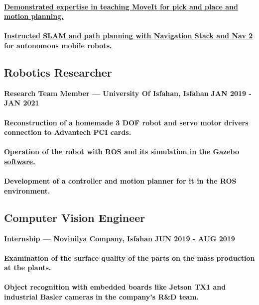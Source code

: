 \documentclass[a4paper]{article}
\begin{document}
\paragraph{\href{https://github.com/ake1999/Robotics_Course_ROS_2023}{Demonstrated expertise in teaching MoveIt for pick and place and motion planning.}}
\paragraph{\href{https://github.com/ake1999/Mobile_Robotics_Course_ROS_2023}{Instructed SLAM and path planning with Navigation Stack and Nav 2 for autonomous mobile robots.}}
\subsection{Robotics Researcher}

{\bfseries\small Research Team Member — University Of Isfahan, Isfahan}
\hfill
{\bfseries\small JAN 2019 - JAN 2021}

\paragraph{Reconstruction of a homemade 3 DOF robot and servo motor drivers connection to Advantech PCI cards.}
\paragraph{\href{https://github.com/ake1999/aarm}{Operation of the robot with ROS and its simulation in the Gazebo software.}}
\paragraph{Development of a controller and motion planner for it in the ROS environment.}
\subsection{Computer Vision Engineer}
{\bfseries\small Internship — Novinilya Company, Isfahan}
\hfill
{\bfseries\small JUN 2019 - AUG 2019}
        
\paragraph{Examination of the surface quality of the parts on the mass production at the plants.}
\paragraph{Object recognition with embedded boards like Jetson TX1 and industrial Basler cameras in the company's R\&D team.}
\end{document}
